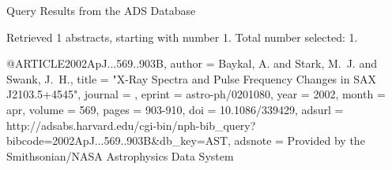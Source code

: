 Query Results from the ADS Database


Retrieved 1 abstracts, starting with number 1.  Total number selected: 1.

@ARTICLE{2002ApJ...569..903B,
   author = {{Baykal}, A. and {Stark}, M.~J. and {Swank}, J.~H.},
    title = "{X-Ray Spectra and Pulse Frequency Changes in SAX J2103.5+4545}",
  journal = {\apj},
   eprint = {astro-ph/0201080},
     year = 2002,
    month = apr,
   volume = 569,
    pages = {903-910},
      doi = {10.1086/339429},
   adsurl = {http://adsabs.harvard.edu/cgi-bin/nph-bib_query?bibcode=2002ApJ...569..903B&db_key=AST},
  adsnote = {Provided by the Smithsonian/NASA Astrophysics Data System}
}


